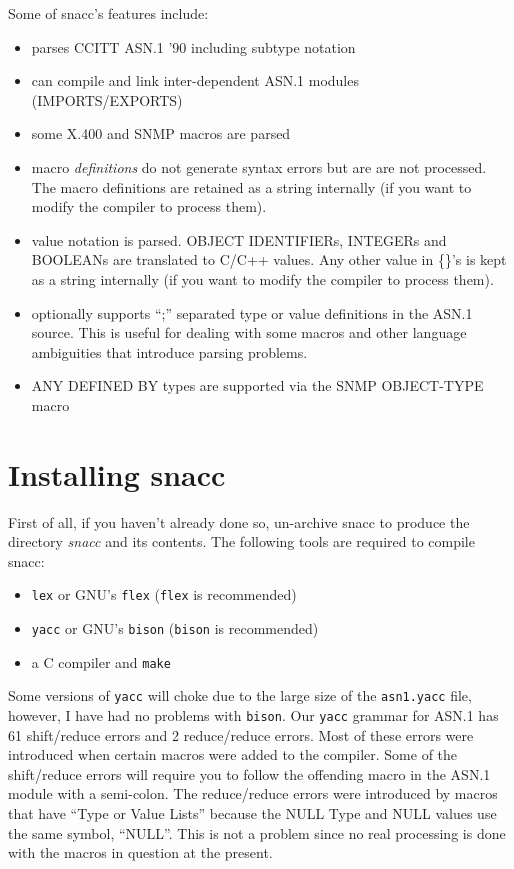 Some of snacc's features include:
\begin {itemize}
\item {parses CCITT ASN.1 '90 including  subtype notation}
\item {can compile and link inter-dependent ASN.1 modules (IMPORTS/EXPORTS)}
\item {some X.400 and SNMP macros are parsed}

\item {macro {\em definitions} do not generate syntax errors but are
are not processed. The macro definitions are retained as a string
internally (if you want to modify the compiler to process them).}

\item {value notation is parsed. OBJECT IDENTIFIERs, INTEGERs
and BOOLEANs are translated to C/C++ values. Any other value in \{\}'s
is kept as a string internally (if you want to modify the compiler to
process them).}

\item {optionally supports ``;'' separated type or value definitions
      in the ASN.1 source. This is useful for dealing with some macros and
      other language ambiguities that introduce parsing problems.}
\item {ANY DEFINED BY types are supported via the SNMP OBJECT-TYPE macro}
\end{itemize}

\section{\label{old-install-section}Installing snacc}

First of all, if you haven't already done so, un-archive snacc to
produce the directory {\em snacc} and its contents.  The following tools
are required to compile snacc:
\begin{itemize}
\item {\verb$lex$ or GNU's \verb$flex$ (\verb$flex$ is recommended)}
\item {\verb$yacc$ or GNU's \verb$bison$ (\verb$bison$ is recommended)}
\item {a C compiler and \verb$make$}
\end{itemize}

Some versions of \verb$yacc$ will choke due to the large size of the
\verb$asn1.yacc$ file, however, I have had no problems with \verb$bison$.
Our \verb$yacc$ grammar for ASN.1 has 61 shift/reduce errors and 2
reduce/reduce errors.  Most of these errors were introduced when
certain macros were added to the compiler.  Some of the shift/reduce
errors will require you to follow the offending macro in the ASN.1
module with a semi-colon.  The reduce/reduce errors were introduced by
macros that have ``Type or Value Lists'' because the NULL Type and
NULL values use the same symbol, ``NULL''.  This is not a problem
since no real processing is done with the macros in question at the
present.

